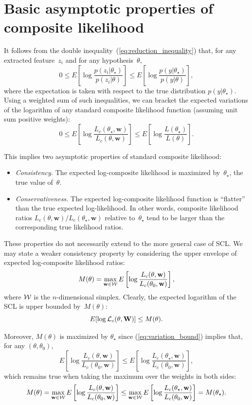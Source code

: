 \documentclass[english]{scrartcl}
\begin{document}
\section{Basic asymptotic properties of composite likelihood}
\label{appendix:asymptotic}

It follows from the double inequality~(\ref{eq:reduction_inequality}) that, for any extracted feature~$z_i$ and for any hypothesis~$\theta$,
$$
0 \leq
E\left[
\log \frac{p(z_i|\theta_\star)}{p(z_i|\theta)}
\right]
\leq
E\left[
\log \frac{p(y|\theta_\star)}{p(y|\theta)}
\right],
$$
where the expectation is taken with respect to the true distribution $p(y|\theta_\star)$. Using a weighted sum of such inequalities, we can bracket the expected variations of the logarithm of any standard composite likelihood function (assuming unit sum positive weights):
\begin{equation}
\label{eq:variation_bound}
0 \leq
E\left[ \log \frac{L_c(\theta_\star, \mathbf{w})}{L_c(\theta, \mathbf{w})} \right]
\leq 
E\left[ \log \frac{L(\theta_\star)}{L(\theta)} \right]
.
\end{equation}

This implies two asymptotic properties of standard composite likelihood: 
\begin{itemize}
\item {\em Consistency.} The expected log-composite likelihood is maximized by~$\theta_\star$, the true value of~$\theta$.
\item {\em Conservativeness.} The expected log-composite likelihood function is ``flatter'' than the true expected log-likelihood. In other words, composite likelihood ratios $L_c(\theta, \mathbf{w})/L_c(\theta_\star, \mathbf{w})$ relative to~$\theta_\star$ tend to be larger than the corresponding true likelihood ratios. 
\end{itemize}

These properties do not necessarily extend to the more general case of SCL. We may state a weaker consistency property by considering the upper envelope of expected log-composite likelihood ratios:
$$
M(\theta) = \max_{\mathbf{w}\in{\cal W}} E\left[ \log \frac{L_c(\theta, \mathbf{w})}{L_c(\theta_0, \mathbf{w})} \right],
$$
where ${\cal W}$ is the $n$-dimensional simplex. Clearly, the expected logarithm of the SCL is upper bounded by~$M(\theta)$:
$$
E[\log {\cal L}_c(\theta, \mathbf{W})] \leq M(\theta)
.
$$

Moreover, $M(\theta)$ is maximized by $\theta_\star$ since (\ref{eq:variation_bound}) implies that, for any $(\theta,\theta_0)$,
$$
E\left[ \log \frac{L_c(\theta, \mathbf{w})}{L_c(\theta_0, \mathbf{w})} \right]
\leq
E\left[ \log \frac{L_c(\theta_\star, \mathbf{w})}{L_c(\theta_0, \mathbf{w})} \right],
$$
which remains true when taking the maximum over the weights in both sides: 
$$
M(\theta) = 
\max_{\mathbf{w}\in{\cal W}} E\left[ \log \frac{L_c(\theta, \mathbf{w})}{L_c(\theta_0, \mathbf{w})} \right]
\leq
\max_{\mathbf{w}\in{\cal W}} E\left[ \log \frac{L_c(\theta_\star, \mathbf{w})}{L_c(\theta_0, \mathbf{w})} \right]
= M(\theta_\star)
.
$$
\end{document}
